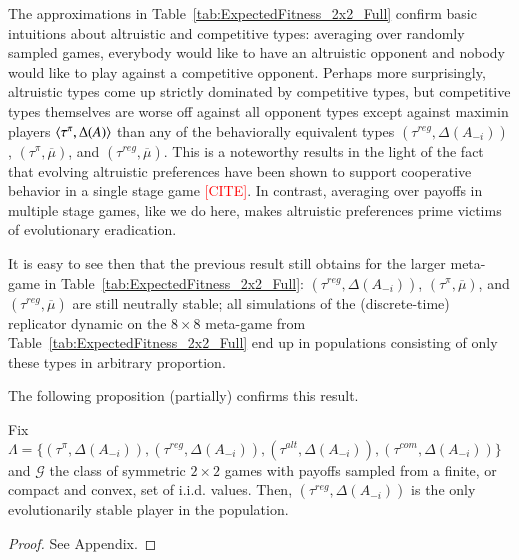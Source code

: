 \documentclass[fleqn,reqno,11pt]{article}
\newcommand{\myalert}[1]{\textcolor{red}{#1}}
\begin{document}
 
The approximations in Table~\ref{tab:ExpectedFitness_2x2_Full} confirm basic intuitions about
altruistic and competitive types: averaging over randomly sampled games, everybody would like
to have an altruistic opponent and nobody would like to play against a competitive
opponent. Perhaps more surprisingly, altruistic types come up strictly dominated by competitive
types, but competitive types themselves are worse off against all opponent types except against
maximin players $\left \langle \tau^{\pi}, \Delta(A)\right\rangle$ than any of the behaviorally equivalent types
$(\tau^{reg}, \Delta(A_{-i}))$, $(\tau^{\pi}, \overline{\mu})$, and
$(\tau^{reg}, \overline{\mu})$.  This is a noteworthy results in the light of the fact that
evolving altruistic preferences have been shown to support cooperative behavior in a single
stage game \myalert{[CITE]}.  In contrast,
averaging over payoffs in multiple stage games, like we do here, makes altruistic preferences
prime victims of evolutionary eradication.

It is easy to see then that the previous result still obtains for the larger meta-game in
Table~\ref{tab:ExpectedFitness_2x2_Full}: $(\tau^{reg}, \Delta(A_{-i}))$,
$(\tau^{\pi}, \overline{\mu})$, and $(\tau^{reg}, \overline{\mu})$ are still neutrally stable;
all simulations of the (discrete-time) replicator dynamic on the $8 \times 8$ meta-game from
Table~\ref{tab:ExpectedFitness_2x2_Full} end up in populations consisting of only these types
in arbitrary proportion.

The following proposition (partially) confirms this result.

\begin{proposition} \label{proposition2}

Fix $\Lambda = \lbrace (\tau^{\pi}, \Delta(A_{-i})), (\tau^{reg}, \Delta(A_{-i})), (\tau^{alt}, \Delta(A_{-i})), (\tau^{com}, \Delta(A_{-i})) \rbrace$ and $\mathcal{G}$ the class of symmetric $2 \times 2$ games with payoffs sampled from a finite, or compact and convex, set of i.i.d. values. Then, $(\tau^{reg}, \Delta(A_{-i}))$ is the only evolutionarily stable player in the population.

\end{proposition}

\begin{proof}
See Appendix.
\end{proof}
\end{document}
